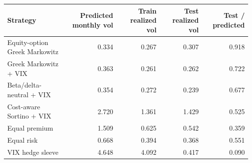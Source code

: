 \begin{tabular}{lrrrr}
\toprule
Strategy & Predicted monthly vol & Train realized vol & Test realized vol & Test / predicted \\
\midrule
Equity-option Greek Markowitz & 0.334 & 0.267 & 0.307 & 0.918 \\
Greek Markowitz + VIX & 0.363 & 0.261 & 0.262 & 0.722 \\
Beta/delta-neutral + VIX & 0.354 & 0.272 & 0.239 & 0.677 \\
Cost-aware Sortino + VIX & 2.720 & 1.361 & 1.429 & 0.525 \\
Equal premium & 1.509 & 0.625 & 0.542 & 0.359 \\
Equal risk & 0.668 & 0.394 & 0.368 & 0.551 \\
VIX hedge sleeve & 4.648 & 4.092 & 0.417 & 0.090 \\
\bottomrule
\end{tabular}

